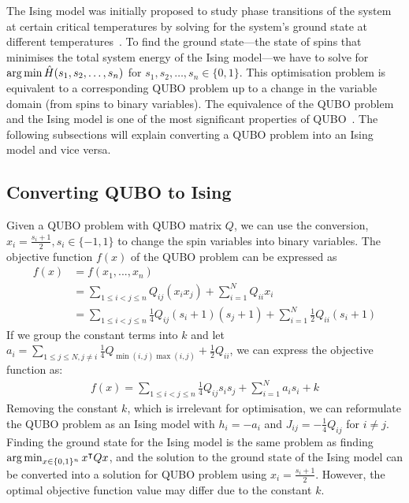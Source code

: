 The Ising model was initially proposed to study phase transitions of the system at certain critical temperatures by solving for the system's ground state at different temperatures~\cite{isingising}. To find the ground state---the state of spins that minimises the total system energy of the Ising model---we have to solve for $ \operatorname*{arg\,min} \Hat{H}(s_1, s_2, \ldots , s_n) $ for $ s_1, s_2, \ldots , s_n \in \{ 0, 1 \}$. This optimisation problem is equivalent to a corresponding QUBO problem up to a change in the variable domain (from spins to binary variables). The equivalence of the QUBO problem and the Ising model is one of the most significant properties of QUBO~\cite{b5}. The following subsections will explain converting a QUBO problem into an Ising model and vice versa.

\subsection{Converting QUBO to Ising}\label{qubotoising}
Given a QUBO problem with QUBO matrix $Q$, we can use the conversion, $x_i = \frac{s_i + 1}{2}, s_i \in \{-1, 1\}$ to change the spin variables into binary variables. The objective function $f(x)$ of the QUBO problem can be expressed as
\begin{align}
    f(x) &= f(x_1, ..., x_n) \nonumber\\
    &= \sum_{1\leq i < j \leq n} Q_{ij}(x_i x_j) + \sum_{i=1}^N Q_{ii} x_i \nonumber \\
    &= \sum_{1\leq i < j \leq n} \frac{1}{4} Q_{ij}(s_i + 1)(s_j + 1) + \sum_{i=1}^N \frac{1}{2} Q_{ii} (s_i + 1) \nonumber
\end{align}
If we group the constant terms into $k$ and let $a_i = \sum_{1\leq j \leq N, j \neq i} \frac{1}{4}Q_{\min(i,j)\max(i,j)} + \frac{1}{2}Q_{ii}$, we can express the objective function as:
\begin{align}
    f(x) = \sum_{1\leq i < j \leq n} \frac{1}{4} Q_{ij}s_i s_j + \sum_{i=1}^N a_i s_i + k \nonumber
\end{align}
Removing the constant $k$, which is irrelevant for optimisation, we can reformulate the QUBO problem as an Ising model with $h_i = -a_i$ and $J_{ij} = -\frac{1}{4}Q_{ij}$ for $i \neq j$. Finding the ground state for the Ising model is the same problem as finding $\operatorname*{arg\,min}_{x \in \{0, 1\}^n} x^\intercal Q x$, and the solution to the ground state of the Ising model can be converted into a solution for QUBO problem using $x_i = \frac{s_i + 1}{2}$. However, the optimal objective function value may differ due to the constant $k$.

